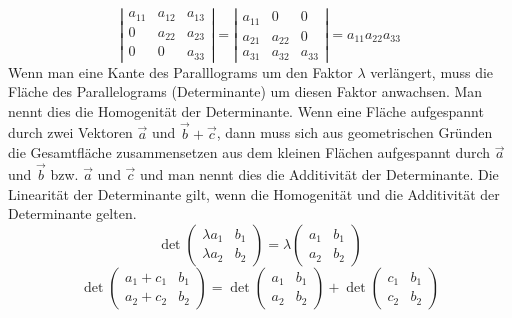\begin{equation}
\boxed{\left\vert\begin{matrix}a_{11}&a_{12}&a_{13}\\0&a_{22}&a_{23}\\0&0&a_{33}\end{matrix}\right\vert=\left\vert\begin{matrix}a_{11}&0&0\\a_{21}&a_{22}&0\\a_{31}&a_{32}&a_{33}\end{matrix}\right\vert=a_{11}a_{22}a_{33}}
\end{equation}
Wenn man eine Kante des Paralllograms um den Faktor $\lambda$ verlängert, muss die Fläche des Parallelograms (Determinante) um diesen Faktor anwachsen. Man nennt dies die Homogenität der Determinante. 
\newline\newline
Wenn eine Fläche aufgespannt durch zwei Vektoren $\overrightarrow{a}$ und $\overrightarrow{b}+\overrightarrow{c}$, dann muss sich aus geometrischen Gründen die Gesamtfläche zusammensetzen aus dem kleinen Flächen aufgespannt durch $\overrightarrow{a}$ und $\overrightarrow{b}$ bzw. $\overrightarrow{a}$ und $\overrightarrow{c}$ und man nennt dies die Additivität der Determinante.
\newline\newline
Die Linearität der Determinante gilt, wenn die Homogenität und die Additivität der Determinante gelten.
\begin{equation}
\boxed{\det\begin{pmatrix}\lambda a_1&b_1\\\lambda a_2&b_2\end{pmatrix}=\lambda\begin{pmatrix}a_1&b_1\\a_2&b_2\end{pmatrix}}
\end{equation}
\begin{equation}
\boxed{\det\begin{pmatrix}a_1+c_1&b_1\\a_2+c_2&b_2\end{pmatrix}=\det\begin{pmatrix}a_1&b_1\\a_2&b_2\end{pmatrix}+\det\begin{pmatrix}c_1&b_1\\c_2&b_2\end{pmatrix}}
\end{equation}
